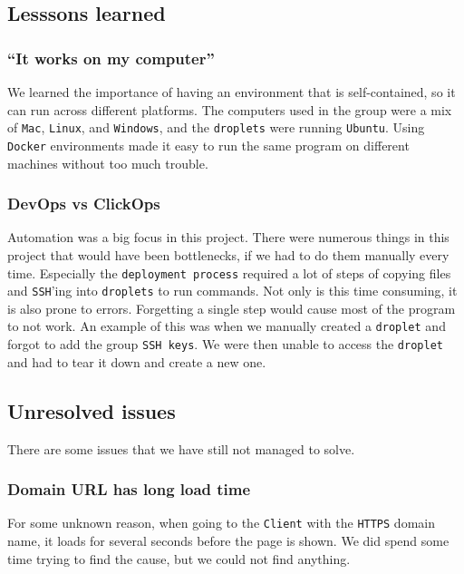 \subsection{Lesssons learned}

\subsubsection{``It works on my computer''}

We learned the importance of having an environment that is 
self-contained, so it can run across different platforms.
The computers used in the group were a mix of \texttt{Mac}, \texttt{Linux}, and \texttt{Windows},
and the \texttt{droplets} were running \texttt{Ubuntu}. 
Using \texttt{Docker} environments made it easy to run the same program
on different machines without too much trouble.

\subsubsection{DevOps vs ClickOps}

Automation was a big focus in this project.
There were numerous things in this project that 
would have been bottlenecks, if we had to do them manually every time.
Especially the \texttt{deployment process} required a lot of steps
of copying files and \texttt{SSH}'ing into \texttt{droplets} to run commands.
Not only is this time consuming, it is also prone to errors.
Forgetting a single step would cause most of the program to not work.
An example of this was when we manually created a \texttt{droplet} and forgot to add the 
group \texttt{SSH keys}. We were then unable to access the \texttt{droplet} and had to 
tear it down and create a new one.

\subsection{Unresolved issues}

There are some issues that we have still not managed to solve.

\subsubsection{Domain URL has long load time}

For some unknown reason, when going to the \texttt{Client} with the \texttt{HTTPS} domain name, 
it loads for several seconds before the page is shown.
We did spend some time trying to find the cause,
but we could not find anything.

